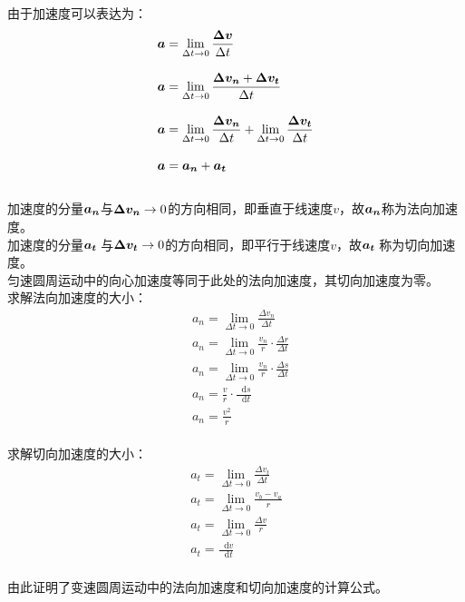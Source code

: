 \documentclass[UTF8]{ctexart}
\newcommand*{\veb}[1]{\vb*{#1}}
\newcommand*{\dif}{\mathop{}\!\mathrm{d}}
\begin{document}
\newpage

    由于加速度可以表达为：
    \begin{align}
        &\veb{a}=\lim_{\Delta t\rightarrow 0}\frac{\veb{\Delta v}}{\Delta t}\\[3mm]
        &\veb{a}=\lim_{\Delta t\rightarrow 0}\frac{\veb{\Delta v_n}+\veb{\Delta v_t}}{\Delta t}\\[3mm]
        &\veb{a}=\lim_{\Delta t\rightarrow 0}\frac{\veb{\Delta v_n}}{\Delta t}+\lim_{\Delta t\rightarrow 0}\frac{\veb{\Delta v_t}}{\Delta t}\\[3mm]
        &\veb{a}=\veb{a_n}+\veb{a_t}
    \end{align}\\
    加速度的分量$\veb{a_n}$与$\veb{\Delta v_n}\rightarrow 0$的方向相同，即垂直于线速度$v$，故$\veb{a_n}$称为法向加速度。\\[3mm]
    加速度的分量$\veb{a_t}\hspace{2.5pt}$与$\veb{\Delta v_t}\rightarrow 0$的方向相同，即平行于线速度$v$，故$\veb{a_t}\hspace{2.5pt}$称为切向加速度。\\[3mm]
    匀速圆周运动中的向心加速度等同于此处的法向加速度，其切向加速度为零。\\[5mm]
    求解法向加速度的大小：
    \begin{align}
        &a_n=\lim_{\Delta t\rightarrow 0}\frac{\Delta v_n}{\Delta t}\\[3mm]
        &a_n=\lim_{\Delta t\rightarrow 0}\frac{v_n}{r}\cdot\frac{\Delta r}{\Delta t}\\[3mm]
        &a_n=\lim_{\Delta t\rightarrow 0}\frac{v_n}{r}\cdot\frac{\Delta s}{\Delta t}\\[3mm]
        &a_n=\frac{v}{r}\cdot\frac{\dif s}{\dif t}\\[3mm]
        &a_n=\frac{v^2}{r}
    \end{align}\\
    求解切向加速度的大小：
    \begin{align}
        &a_t=\lim_{\Delta t\rightarrow 0}\frac{\Delta v_t}{\Delta t}\\[3mm]
        &a_t=\lim_{\Delta t\rightarrow 0}\frac{v_b-v_a}{r}~~~\\[3mm]
        &a_t=\lim_{\Delta t\rightarrow 0}\frac{\Delta v}{r}\\[3mm]
        &a_t=\frac{\dif v}{\dif t}
    \end{align}\\
    由此证明了变速圆周运动中的法向加速度和切向加速度的计算公式。
\end{document}
